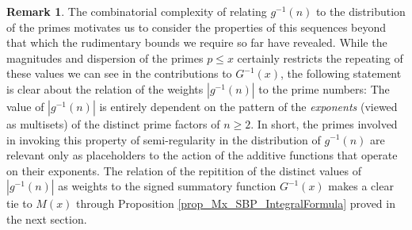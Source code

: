 \documentclass[11pt,reqno,a4letter]{article}
\numberwithin{figure}{section}
\numberwithin{table}{section}
\theoremstyle{plain}
\numberwithin{theorem}{section}
\theoremstyle{definition}
\newtheorem{remark}[theorem]{Remark}
\begin{document}
\begin{remark} 
The combinatorial complexity of relating $g^{-1}(n)$ to the distribution of the primes 
motivates us to consider the properties of this sequences beyond that which the rudimentary 
bounds we require so far have revealed. 
While the magnitudes and dispersion of the primes $p \leq x$ certainly restricts the 
repeating of these values we can see in the contributions to $G^{-1}(x)$, the following 
statement is clear about the relation of the weights $|g^{-1}(n)|$ to the prime numbers: 
The value of $|g^{-1}(n)|$ is entirely dependent on the pattern of the \emph{exponents} 
(viewed as multisets) of the distinct prime factors of $n \geq 2$. 
In short, the primes involved in invoking this property of semi-regularity in the 
distribution of $g^{-1}(n)$ are relevant only as placeholders to the action of the 
additive functions that operate on their exponents. 
The relation of the repitition of the distinct values 
of $|g^{-1}(n)|$ as weights to the signed summatory function $G^{-1}(x)$ makes a clear tie to 
$M(x)$ through Proposition \ref{prop_Mx_SBP_IntegralFormula} proved in the next section. 
\end{remark}
\end{document}
